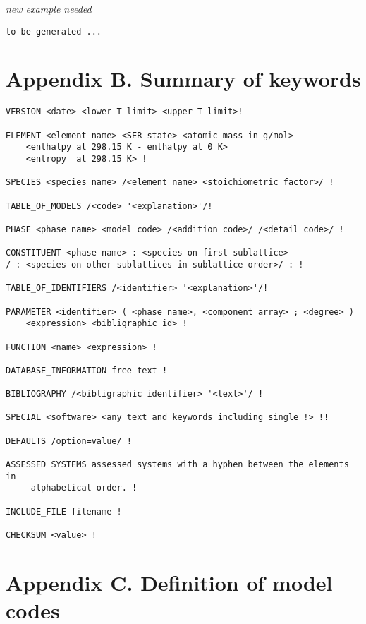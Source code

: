 \documentclass[12pt]{article}
\begin{document}
{\em new example needed}

{\small
\begin{verbatim}
to be generated ...
\end{verbatim}
}

\newpage

\section{Appendix B.  Summary of keywords}

\begin{verbatim}
VERSION <date> <lower T limit> <upper T limit>!

ELEMENT <element name> <SER state> <atomic mass in g/mol>
    <enthalpy at 298.15 K - enthalpy at 0 K>
    <entropy  at 298.15 K> !

SPECIES <species name> /<element name> <stoichiometric factor>/ !

TABLE_OF_MODELS /<code> '<explanation>'/!

PHASE <phase name> <model code> /<addition code>/ /<detail code>/ !

CONSTITUENT <phase name> : <species on first sublattice> 
/ : <species on other sublattices in sublattice order>/ : !

TABLE_OF_IDENTIFIERS /<identifier> '<explanation>'/!

PARAMETER <identifier> ( <phase name>, <component array> ; <degree> )
    <expression> <bibligraphic id> !

FUNCTION <name> <expression> !

DATABASE_INFORMATION free text !

BIBLIOGRAPHY /<bibligraphic identifier> '<text>'/ !

SPECIAL <software> <any text and keywords including single !> !!

DEFAULTS /option=value/ !

ASSESSED_SYSTEMS assessed systems with a hyphen between the elements in
     alphabetical order. !

INCLUDE_FILE filename !

CHECKSUM <value> !

\end{verbatim}

\newpage

\section{Appendix C.  Definition of model codes}
\end{document}
